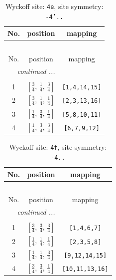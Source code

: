 \documentclass[fleqn,8pt]{jsarticle}
\begin{document}
\renewcommand{\arraystretch}{1.2}
\begin{longtable}{ccc}
\caption{Wyckoff site: {\tt 4e}, site symmetry: {\tt -4'..}}
 \\
 \hline \hline
No. & position & mapping \\ \hline \endfirsthead

\multicolumn{2}{l}{\tablename\ \thetable{}} \\
 \hline \hline
No. & position & mapping \\ \hline \endhead

 \hline \hline
\multicolumn{2}{r}{\footnotesize\it continued ...} \\ \endfoot

 \hline \hline
\multicolumn{2}{r}{} \\ \endlastfoot

1 & $\left[ \frac{3}{4},\, \frac{1}{4},\, \frac{3}{4} \right]$ & {\tt [1,4,14,15]} \\ \hline
2 & $\left[ \frac{3}{4},\, \frac{1}{4},\, \frac{1}{4} \right]$ & {\tt [2,3,13,16]} \\ \hline
3 & $\left[ \frac{1}{4},\, \frac{3}{4},\, \frac{1}{4} \right]$ & {\tt [5,8,10,11]} \\ \hline
4 & $\left[ \frac{1}{4},\, \frac{3}{4},\, \frac{3}{4} \right]$ & {\tt [6,7,9,12]} \\
\end{longtable}
\renewcommand{\arraystretch}{1.2}
\begin{longtable}{ccc}
\caption{Wyckoff site: {\tt 4f}, site symmetry: {\tt -4..}}
 \\
 \hline \hline
No. & position & mapping \\ \hline \endfirsthead

\multicolumn{2}{l}{\tablename\ \thetable{}} \\
 \hline \hline
No. & position & mapping \\ \hline \endhead

 \hline \hline
\multicolumn{2}{r}{\footnotesize\it continued ...} \\ \endfoot

 \hline \hline
\multicolumn{2}{r}{} \\ \endlastfoot

1 & $\left[ \frac{3}{4},\, \frac{3}{4},\, \frac{3}{4} \right]$ & {\tt [1,4,6,7]} \\ \hline
2 & $\left[ \frac{1}{4},\, \frac{1}{4},\, \frac{1}{4} \right]$ & {\tt [2,3,5,8]} \\ \hline
3 & $\left[ \frac{1}{4},\, \frac{1}{4},\, \frac{3}{4} \right]$ & {\tt [9,12,14,15]} \\ \hline
4 & $\left[ \frac{3}{4},\, \frac{3}{4},\, \frac{1}{4} \right]$ & {\tt [10,11,13,16]} \\
\end{longtable}
\end{document}
